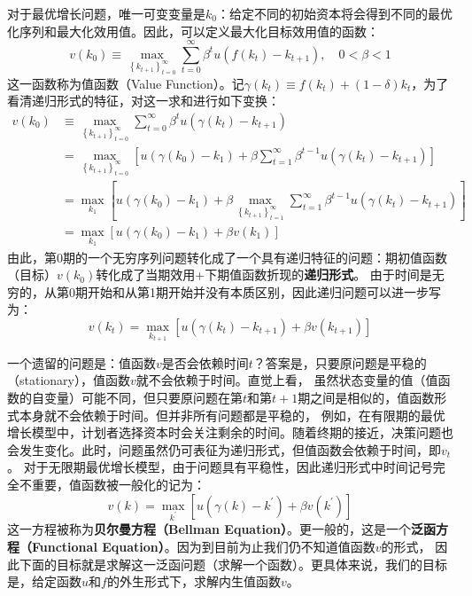对于最优增长问题，唯一可变变量是$k_0$：给定不同的初始资本将会得到不同的最优化序列和最大化效用值。因此，可以定义最大化目标效用值的函数：
$$
v\left(k_0\right) \equiv \max _{\left\{k_{t+1}\right\}_{t=0}^{\infty}} \sum_{t=0}^{\infty} \beta^t u\left(f\left(k_t\right)-k_{t+1}\right), \quad 0<\beta<1
$$
这一函数称为值函数（Value Function）。记$\gamma\left(k_t\right)\equiv f\left(k_t\right)+\left(1-\delta\right)k_t$，为了看清递归形式的特征，对这一求和进行如下变换：
$$
\begin{aligned}
v\left(k_0\right) & \equiv \max _{\left\{k_{t+1}\right\}_{t=0}^{\infty}} \sum_{t=0}^{\infty} \beta^t u\left(\gamma\left(k_t\right)-k_{t+1}\right) \\
& =\max _{\left\{k_{t+1}\right\}_{t=0}^{\infty}}\left[u\left(\gamma\left(k_0\right)-k_1\right)+
    \beta \sum_{t=1}^{\infty} \beta^{t-1} u\left(\gamma\left(k_t\right)-k_{t+1}\right)\right] \\
& =\max _{k_1}\left[u\left(\gamma\left(k_0\right)-k_1\right)+
    \beta \max _{\left\{k_{t+1}\right\}_{t=1}^{\infty}} \sum_{t=1}^{\infty} \beta^{t-1} u\left(\gamma\left(k_t\right)-k_{t+1}\right)\right] \\
& =\max _{k_1}\left[u\left(\gamma\left(k_0\right)-k_1\right)+\beta v\left(k_1\right)\right]
\end{aligned}
$$
由此，第0期的一个无穷序列问题转化成了一个具有递归特征的问题：期初值函数（目标）$v\left(k_0\right)$转化成了当期效用+下期值函数折现的\textbf{递归形式}。
由于时间是无穷的，从第0期开始和从第1期开始并没有本质区别，因此递归问题可以进一步写为：
$$
v\left(k_t\right)=\max _{k_{t+1}}\left[u\left(\gamma\left(k_t\right)-k_{t+1}\right)+\beta v\left(k_{t+1}\right)\right]
$$

一个遗留的问题是：值函数$v$是否会依赖时间$t$？答案是，只要原问题是平稳的（stationary），值函数$v$就不会依赖于时间。直觉上看，
虽然状态变量的值（值函数的自变量）可能不同，但只要原问题在第$t$和第$t+1$期之间是相似的，值函数形式本身就不会依赖于时间。但并非所有问题都是平稳的，
例如，在有限期的最优增长模型中，计划者选择资本时会关注剩余的时间。随着终期的接近，决策问题也会发生变化。此时，问题虽然仍可表征为递归形式，但值函数会依赖于时间，即$v_t$。
对于无限期最优增长模型，由于问题具有平稳性，因此递归形式中时间记号完全不重要，值函数被一般化的记为：
\begin{equation}    \label{eq-bellman}
    v\left(k\right)=\max _{k^{\prime}}\left[u\left(\gamma\left(k\right)-k^{\prime}\right)+\beta v\left(k^{\prime}\right)\right]
\end{equation}
这一方程被称为\textbf{贝尔曼方程（Bellman Equation）}。更一般的，这是一个\textbf{泛函方程（Functional Equation）}。因为到目前为止我们仍不知道值函数$v$的形式，
因此下面的目标就是求解这一泛函问题（求解一个函数）。更具体来说，我们的目标是，给定函数$u$和$f$的外生形式下，求解内生值函数$v$。

